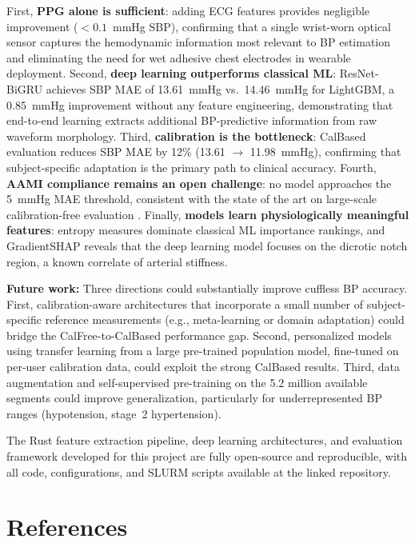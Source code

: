 \documentclass[11pt]{article}
\begin{document}
First, \textbf{PPG alone is sufficient}: adding ECG features provides negligible improvement ($< 0.1$~mmHg SBP), confirming that a single wrist-worn optical sensor captures the hemodynamic information most relevant to BP estimation and eliminating the need for wet adhesive chest electrodes in wearable deployment. Second, \textbf{deep learning outperforms classical ML}: ResNet-BiGRU achieves SBP MAE of 13.61~mmHg vs.\ 14.46~mmHg for LightGBM, a 0.85~mmHg improvement without any feature engineering, demonstrating that end-to-end learning extracts additional BP-predictive information from raw waveform morphology. Third, \textbf{calibration is the bottleneck}: CalBased evaluation reduces SBP MAE by 12\% (13.61 $\to$ 11.98~mmHg), confirming that subject-specific adaptation is the primary path to clinical accuracy. Fourth, \textbf{AAMI compliance remains an open challenge}: no model approaches the 5~mmHg MAE threshold, consistent with the state of the art on large-scale calibration-free evaluation \citep{moulaeifard2025pulsedb}. Finally, \textbf{models learn physiologically meaningful features}: entropy measures dominate classical ML importance rankings, and GradientSHAP reveals that the deep learning model focuses on the dicrotic notch region, a known correlate of arterial stiffness.

\textbf{Future work:} Three directions could substantially improve cuffless BP accuracy. First, calibration-aware architectures that incorporate a small number of subject-specific reference measurements (e.g., meta-learning or domain adaptation) could bridge the CalFree-to-CalBased performance gap. Second, personalized models using transfer learning from a large pre-trained population model, fine-tuned on per-user calibration data, could exploit the strong CalBased results. Third, data augmentation and self-supervised pre-training on the 5.2 million available segments could improve generalization, particularly for underrepresented BP ranges (hypotension, stage~2 hypertension).

The Rust feature extraction pipeline, deep learning architectures, and evaluation framework developed for this project are fully open-source and reproducible, with all code, configurations, and SLURM scripts available at the linked repository.

\section{References}
\end{document}
